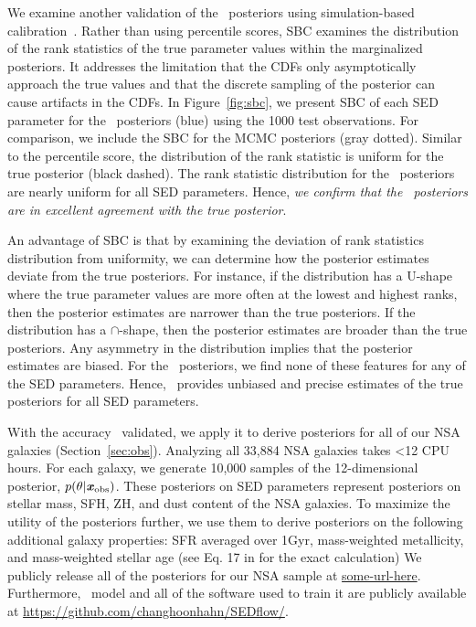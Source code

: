 We examine another validation of the \sedflow~posteriors using simulation-based
calibration~\citep[SBC;][]{talts2020}. 
Rather than using percentile scores, SBC examines the distribution of the rank
statistics of the true parameter values within the marginalized posteriors. 
It addresses the limitation that the CDFs only asymptotically approach the true
values and that the discrete sampling of the posterior can cause artifacts in
the CDFs. 
In Figure~\ref{fig:sbc}, we present SBC of each SED parameter for the
\sedflow~posteriors (blue) using the 1000 test observations.
For comparison, we include the SBC for the MCMC posteriors (gray dotted). 
Similar to the percentile score, the distribution of the rank statistic is
uniform for the true posterior (black dashed). 
The rank statistic distribution for the \sedflow~posteriors are nearly uniform
for all SED parameters. 
Hence, \emph{we confirm that the \sedflow~posteriors are in excellent agreement
with the true posterior}.

An advantage of SBC is that by examining the deviation of rank statistics
distribution from uniformity, we can determine how the posterior estimates
deviate from the true posteriors. 
For instance, if the distribution has a U-shape where the true parameter values
are more often at the lowest and highest ranks, then the posterior estimates
are narrower than the true posteriors.
If the distribution has a $\cap$-shape, then the posterior estimates are
broader than the true posteriors. 
Any asymmetry in the distribution implies that the posterior estimates are
biased.  
For the \sedflow~posteriors, we find none of these features for any of the SED
parameters. 
Hence, \sedflow~provides unbiased and precise estimates of the true posteriors
for all SED parameters. 

With the accuracy \sedflow~validated, we apply it to derive posteriors for all
of our NSA galaxies (Section~\ref{sec:obs}). 
Analyzing all 33,884 NSA galaxies takes <12 CPU hours. 
For each galaxy, we generate 10,000 samples of the 12-dimensional posterior,
$p(\theta | \textbf{\textit{x}}_{\rm obs})$. 
These posteriors on SED parameters represent posteriors on stellar mass, SFH,
ZH, and dust content of the NSA galaxies. 
To maximize the utility of the posteriors further, we use them to derive
posteriors on the following additional galaxy properties: SFR averaged over
1Gyr, mass-weighted metallicity, and mass-weighted stellar age (see
Eq. 17 in \citealt{hahn2022} for the exact calculation)
We publicly release all of the posteriors for our NSA sample at 
\url{some-url-here}. 
Furthermore, \sedflow~model and all of the software used to train it are
publicly available at \url{https://github.com/changhoonhahn/SEDflow/}. 
